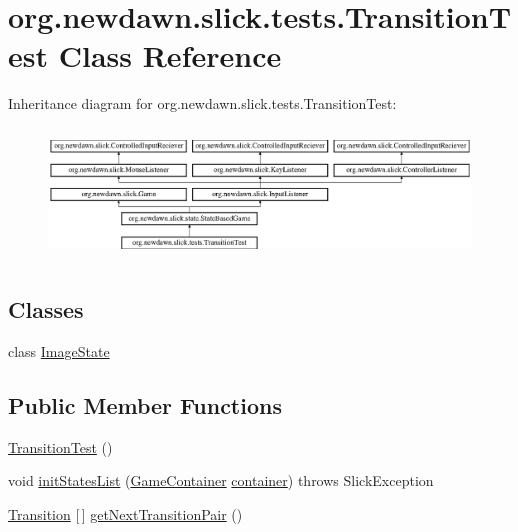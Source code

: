 \hypertarget{classorg_1_1newdawn_1_1slick_1_1tests_1_1_transition_test}{}\section{org.\+newdawn.\+slick.\+tests.\+Transition\+Test Class Reference}
\label{classorg_1_1newdawn_1_1slick_1_1tests_1_1_transition_test}
Inheritance diagram for org.\+newdawn.\+slick.\+tests.\+Transition\+Test\+:\begin{figure}[H]
\begin{center}
\leavevmode
\includegraphics[height=3.522012cm]{classorg_1_1newdawn_1_1slick_1_1tests_1_1_transition_test}
\end{center}
\end{figure}
\subsection*{Classes}
\begin{DoxyCompactItemize}
\item 
class \mbox{\hyperlink{classorg_1_1newdawn_1_1slick_1_1tests_1_1_transition_test_1_1_image_state}{Image\+State}}
\end{DoxyCompactItemize}
\subsection*{Public Member Functions}
\begin{DoxyCompactItemize}
\item 
\mbox{\hyperlink{classorg_1_1newdawn_1_1slick_1_1tests_1_1_transition_test_ae2a4a1049ab878b413fea99c428a8c28}{Transition\+Test}} ()
\item 
void \mbox{\hyperlink{classorg_1_1newdawn_1_1slick_1_1tests_1_1_transition_test_a9e704bb52bf4c4004cb91dec7ff02364}{init\+States\+List}} (\mbox{\hyperlink{classorg_1_1newdawn_1_1slick_1_1_game_container}{Game\+Container}} \mbox{\hyperlink{classorg_1_1newdawn_1_1slick_1_1state_1_1_state_based_game_a538846600436175cbed48450adfdd025}{container}})  throws Slick\+Exception 
\item 
\mbox{\hyperlink{interfaceorg_1_1newdawn_1_1slick_1_1state_1_1transition_1_1_transition}{Transition}} \mbox{[}$\,$\mbox{]} \mbox{\hyperlink{classorg_1_1newdawn_1_1slick_1_1tests_1_1_transition_test_a58d5d7172cabffd0d18457cbf8a90e6b}{get\+Next\+Transition\+Pair}} ()
\end{DoxyCompactItemize}
